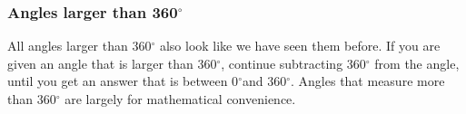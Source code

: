             \subsubsection{  Angles larger than 360${}^{\circ }$ }
            \nopagebreak
        \label{m39370*id314877}All angles larger than 360\begin{math}{}^{\circ }\end{math} also look like we have seen them before. If you are given an angle that is larger than 360\begin{math}{}^{\circ }\end{math}, continue subtracting 360\begin{math}{}^{\circ }\end{math} from the angle, until you get an answer that is between 0\begin{math}{}^{\circ }\end{math}and 360\begin{math}{}^{\circ }\end{math}. Angles that measure more than 360\begin{math}{}^{\circ }\end{math} are largely for mathematical convenience. \par 
\label{m39370*notfhsst!!!underscore!!!id213}
